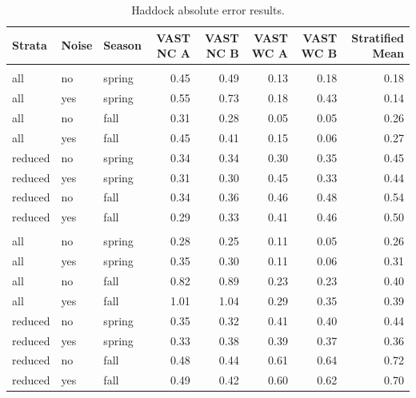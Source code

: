 \documentclass[
  12pt,
]{article}
\begin{document}
\begin{table}

\caption{\label{tab:HadERROR}Haddock absolute error results.}
\centering
\fontsize{10}{12}\selectfont
\begin{tabular}[t]{lllrrrrr}
\toprule
Strata & Noise & Season & VAST NC  A & VAST NC  B & VAST WC A & VAST WC B & Stratified Mean\\
\midrule
\addlinespace[0.3em]
\multicolumn{1}{l}{\textbf{Constant Temp.}}\\
\hspace{1em}all & no & spring & 0.45 & 0.49 & 0.13 & 0.18 & 0.18\\
\hspace{1em}all & yes & spring & 0.55 & 0.73 & 0.18 & 0.43 & 0.14\\
\hspace{1em}all & no & fall & 0.31 & 0.28 & 0.05 & 0.05 & 0.26\\
\hspace{1em}all & yes & fall & 0.45 & 0.41 & 0.15 & 0.06 & 0.27\\
\hspace{1em}reduced & no & spring & 0.34 & 0.34 & 0.30 & 0.35 & 0.45\\
\hspace{1em}reduced & yes & spring & 0.31 & 0.30 & 0.45 & 0.33 & 0.44\\
\hspace{1em}reduced & no & fall & 0.34 & 0.36 & 0.46 & 0.48 & 0.54\\
\hspace{1em}reduced & yes & fall & 0.29 & 0.33 & 0.41 & 0.46 & 0.50\\
\addlinespace[0.3em]
\multicolumn{1}{l}{\textbf{Increasing Temp.}}\\
\hspace{1em}all & no & spring & 0.28 & 0.25 & 0.11 & 0.05 & 0.26\\
\hspace{1em}all & yes & spring & 0.35 & 0.30 & 0.11 & 0.06 & 0.31\\
\hspace{1em}all & no & fall & 0.82 & 0.89 & 0.23 & 0.23 & 0.40\\
\hspace{1em}all & yes & fall & 1.01 & 1.04 & 0.29 & 0.35 & 0.39\\
\hspace{1em}reduced & no & spring & 0.35 & 0.32 & 0.41 & 0.40 & 0.44\\
\hspace{1em}reduced & yes & spring & 0.33 & 0.38 & 0.39 & 0.37 & 0.36\\
\hspace{1em}reduced & no & fall & 0.48 & 0.44 & 0.61 & 0.64 & 0.72\\
\hspace{1em}reduced & yes & fall & 0.49 & 0.42 & 0.60 & 0.62 & 0.70\\
\bottomrule
\end{tabular}
\end{table}
\end{document}
